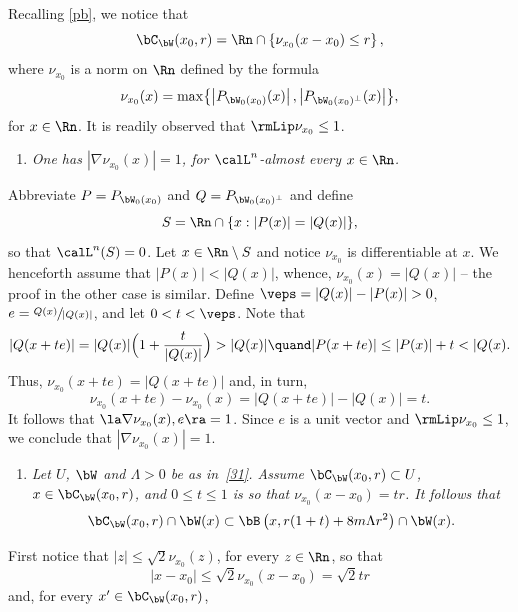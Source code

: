 \begin{Empty}[Polyballs]
\label{pb.complement}
Recalling \ref{pb}, we notice that
\begin{equation*}
\bC_{\bW}(x_0,r) = \Rn \cap \left\{ \nu_{x_0}(x-x_0) \leq r \right\},
\end{equation*}
where $\nu_{x_0}$ is a norm on $\Rn$ defined by the formula
\begin{equation*}
\nu_{x_0}(x) = \max \bigl\{ \left| P_{\bW_0(x_0)}(x) \right|, \left| P_{\bW_0(x_0)^\perp}(x) \right| \bigr\},
\end{equation*}
for $x \in \Rn$.
It is readily observed that $\rmLip \nu_{x_0} \leq 1$.
\begin{enumerate}
\item\label{enum:8.3.1} \emph{One has $|\nabla \nu_{x_0}(x) | = 1$, for $\calL^n$-almost every $x \in \Rn$.}
\end{enumerate}
\par
Abbreviate $P = P_{\bW_0(x_0)}$ and $Q = P_{\bW_0(x_0)^\perp}$ and define
\[
S = \Rn \cap \{ x: |P(x)| = |Q(x)| \},
\]
so that $\calL^n(S)=0$.
Let $x \in \Rn \setminus S$ and notice $\nu_{x_0}$ is differentiable at $x$.
We henceforth assume that $|P(x)| < |Q(x)|$, whence, $\nu_{x_0}(x) = |Q(x)|$ -- the proof in the other case is similar.
Define $\veps = |Q(x)| - |P(x)| > 0$, $e = \sfrac{Q(x)}{|Q(x)|}$, and let $0 < t < \veps$.
Note that
\[
|Q(x + te)| = |Q(x)| \Bigl(1 + \frac{t}{|Q(x)|}\Bigr) > |Q(x)|\quand|P(x + te)| \leq |P(x)| + t < |Q(x).
\]
Thus, $\nu_{x_0}(x+te) = |Q(x+te)|$ and, in turn,
\[
\nu_{x_0}(x+te) - \nu_{x_0}(x) = |Q(x+te)| - |Q(x)| = t.
\]
It follows that $\la \nabla \nu_{x_0}(x), e \ra = 1$.
Since $e$ is a unit vector and $\rmLip \nu_{x_0} \leq 1$, we conclude that $|\nabla \nu_{x_0}(x)| = 1$.
\begin{enumerate}
\item\label{enum:8.3.2} \emph{Let $U$, $\bW$ and $\Lambda > 0$ be as in~\ref{31}. Assume $\bC_{\bW}(x_0,r) \subset U$, $x \in \bC_{\bW}(x_0,r)$, and $0 \leq t \leq 1$ is so that $\nu_{x_0}(x-x_0) = tr$. It follows that
\begin{equation*}
\bC_{\bW}(x_0,r) \cap \bW(x) \subset \bB \left(x, r(1+t) + 8m\Lambda r^2\right) \cap \bW(x).
\end{equation*}
}
\end{enumerate}
\par
First notice that $|z| \leq \sqrt{2} \nu_{x_0}(z)$, for every $z \in \Rn$, so that
\[
|x-x_0| \leq \sqrt{2} \nu_{x_0}(x-x_0) = \sqrt{2} tr
\]
and, for every $x' \in \bC_\bW(x_0,r)$,

\end{Empty}
